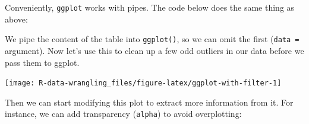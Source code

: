 \documentclass[]{book}
\newenvironment{Shaded}{\begin{snugshade}}{\end{snugshade}}
\newcommand{\KeywordTok}[1]{\textcolor[rgb]{0.13,0.29,0.53}{\textbf{#1}}}
\newcommand{\DataTypeTok}[1]{\textcolor[rgb]{0.13,0.29,0.53}{#1}}
\newcommand{\FloatTok}[1]{\textcolor[rgb]{0.00,0.00,0.81}{#1}}
\newcommand{\StringTok}[1]{\textcolor[rgb]{0.31,0.60,0.02}{#1}}
\newcommand{\OperatorTok}[1]{\textcolor[rgb]{0.81,0.36,0.00}{\textbf{#1}}}
\newcommand{\NormalTok}[1]{#1}
\theoremstyle{definition}
\theoremstyle{definition}
\theoremstyle{definition}
\theoremstyle{remark}
\begin{document}
Conveniently, \texttt{ggplot} works with pipes. The code below does the
same thing as above:

\begin{Shaded}
\end{Shaded}

We pipe the content of the table into \texttt{ggplot()}, so we can omit
the first (\texttt{data\ =} argument). Now let's use this to clean up a
few odd outliers in our data before we pass them to ggplot.

\begin{Shaded}
\end{Shaded}

\texttt{[image: R-data-wrangling\_files/figure-latex/ggplot-with-filter-1]}

Then we can start modifying this plot to extract more information from
it. For instance, we can add transparency (\texttt{alpha}) to avoid
overplotting:

\begin{Shaded}
\end{Shaded}
\end{document}
